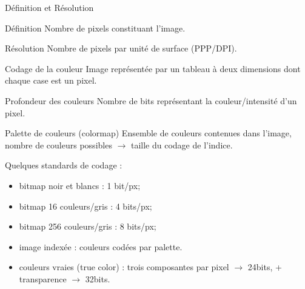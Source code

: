 \documentclass[14pt]{beamer}
\begin{document}
\begin{frame}{Définition et Résolution}

\begin{block}{Définition}
Nombre de pixels constituant l'image.
\end{block}
\vfill
\begin{block}{Résolution}
Nombre de pixels par unité de surface (PPP/DPI).
\end{block}
\end{frame}


\begin{frame}{Codage de la couleur}
    Image représentée par un tableau à deux dimensions dont chaque case est un pixel.
    \begin{block}{Profondeur des couleurs}
    Nombre de bits représentant la couleur/intensité d'un pixel.
    \end{block}
    \begin{block}{Palette de couleurs (colormap)}
    Ensemble de couleurs contenues dans l'image, nombre de couleurs possibles $\rightarrow$ taille du codage de l'indice.
    \end{block}
    
\end{frame}


\begin{frame}
    Quelques standards de codage :
    \begin{itemize}
    \item bitmap noir et blancs : 1 bit/px;
    \item bitmap 16 couleurs/gris : 4 bits/px;
    \item bitmap 256 couleurs/gris : 8 bits/px;
    \item image indexée : couleurs codées par palette.
    \item couleurs vraies (true color) : trois composantes par pixel  $\rightarrow$ 24bits, + transparence $\rightarrow$ 32bits.
    \end{itemize}
\end{frame}
\end{document}
